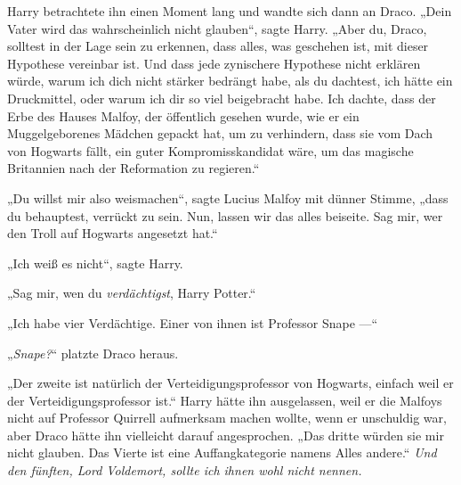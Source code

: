 Harry betrachtete ihn einen Moment lang und wandte sich dann an Draco.
„Dein Vater wird das wahrscheinlich nicht glauben“, sagte Harry.
„Aber du, Draco, solltest in der Lage sein zu erkennen, dass alles, was geschehen ist, mit dieser Hypothese vereinbar ist. Und dass jede zynischere Hypothese nicht erklären würde, warum ich dich nicht stärker bedrängt habe, als du dachtest, ich hätte ein Druckmittel, oder warum ich dir so viel beigebracht habe. Ich dachte, dass der Erbe des Hauses Malfoy, der öffentlich gesehen wurde, wie er ein Muggelgeborenes Mädchen gepackt hat, um zu verhindern, dass sie vom Dach von Hogwarts fällt, ein guter Kompromisskandidat wäre, um das magische Britannien nach der Reformation zu regieren.“

„Du willst mir also weismachen“, sagte Lucius Malfoy mit dünner Stimme, „dass du behauptest, verrückt zu sein. Nun, lassen wir das alles beiseite. Sag mir, wer den Troll auf Hogwarts angesetzt hat.“

„Ich weiß es nicht“, sagte Harry.

„Sag mir, wen du \emph{verdächtigst}, Harry Potter.“

„Ich habe vier Verdächtige. Einer von ihnen ist Professor Snape —“

„\emph{Snape?}“ platzte Draco heraus.

„Der zweite ist natürlich der Verteidigungsprofessor von Hogwarts, einfach weil er der Verteidigungsprofessor ist.“ Harry hätte ihn ausgelassen, weil er die Malfoys nicht auf Professor Quirrell aufmerksam machen wollte, wenn er unschuldig war, aber Draco hätte ihn vielleicht darauf angesprochen.
„Das dritte würden sie mir nicht glauben. Das Vierte ist eine Auffangkategorie namens Alles andere.“
\emph{Und den fünften, Lord Voldemort, sollte ich ihnen wohl nicht nennen.}

